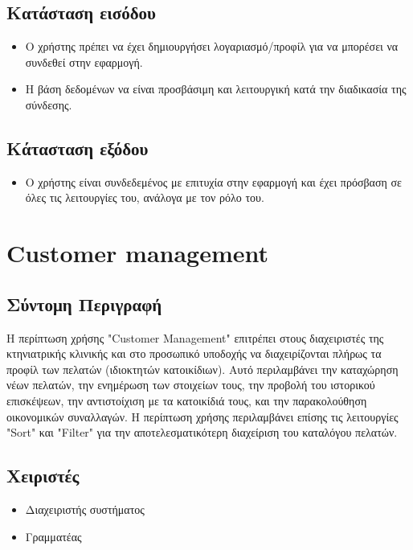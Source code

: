 \documentclass[12pt,a4paper,twoside]{book}
\begin{document}
\subsection{Κατάσταση εισόδου} %
\begin{itemize}
  \item Ο χρήστης πρέπει να έχει δημιουργήσει λογαριασμό/προφίλ για να μπορέσει να συνδεθεί στην εφαρμογή. %
  \item Η βάση δεδομένων να είναι προσβάσιμη και λειτουργική κατά την διαδικασία της σύνδεσης. %
\end{itemize}

\subsection{Κάτασταση εξόδου} %
\begin{itemize}
  \item Ο χρήστης είναι συνδεδεμένος με επιτυχία στην εφαρμογή και έχει πρόσβαση σε όλες τις λειτουργίες του, ανάλογα με τον ρόλο του. %
\end{itemize}

\section{Customer management}

\subsection{Σύντομη Περιγραφή}
Η περίπτωση χρήσης "Customer Management" επιτρέπει στους διαχειριστές της κτηνιατρικής κλινικής και στο προσωπικό υποδοχής να διαχειρίζονται πλήρως τα προφίλ των πελατών (ιδιοκτητών κατοικίδιων). Αυτό περιλαμβάνει την καταχώρηση νέων πελατών, την ενημέρωση των στοιχείων τους, την προβολή του ιστορικού επισκέψεων, την αντιστοίχιση με τα κατοικίδιά τους, και την παρακολούθηση οικονομικών συναλλαγών. Η περίπτωση χρήσης περιλαμβάνει επίσης τις λειτουργίες "Sort" και "Filter" για την αποτελεσματικότερη διαχείριση του καταλόγου πελατών. %

\subsection{Χειριστές}
\begin{itemize}
  \item Διαχειριστής συστήματος
  \item Γραμματέας
\end{itemize}
\end{document}
